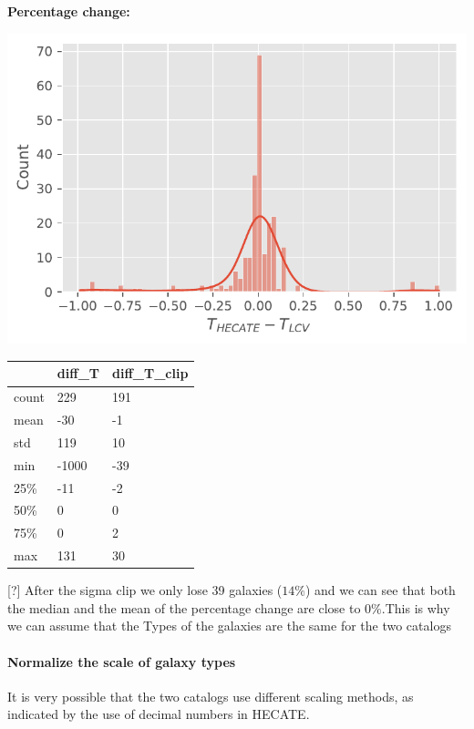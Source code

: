 \documentclass[
]{article}
\let\oldparagraph\paragraph
\renewcommand{\paragraph}[1]{\oldparagraph{#1}\mbox{}}
\begin{document}
\textbf{Percentage change:}

\includegraphics{compare_files/figure-pdf/cell-22-output-1.pdf}

\begin{longtable}[]{@{}lll@{}}
\toprule\noalign{}
& diff\_T & diff\_T\_clip \\
\midrule\noalign{}
\endhead
\bottomrule\noalign{}
\endlastfoot
count & 229 & 191 \\
mean & -30 & -1 \\
std & 119 & 10 \\
min & -1000 & -39 \\
25\% & -11 & -2 \\
50\% & 0 & 0 \\
75\% & 0 & 2 \\
max & 131 & 30 \\
\end{longtable}

{[}?{]} After the sigma clip we only lose 39 galaxies (\(14\%\)) and we
can see that both the median and the mean of the percentage change are
close to \(0\%\).This is why we can assume that the Types of the
galaxies are the same for the two catalogs

\paragraph{Normalize the scale of galaxy
types}\label{normalize-the-scale-of-galaxy-types}

It is very possible that the two catalogs use different scaling methods,
as indicated by the use of decimal numbers in HECATE.
\end{document}
